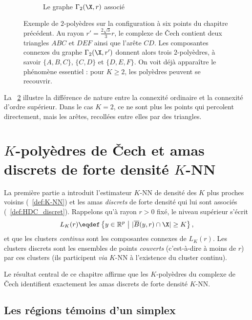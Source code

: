 \begin{figure}[!ht]
\begin{subfigure}[b]{0.48\textwidth}
        \caption{Le graphe $\Gamma_2(\X,r)$ associé}
        \label{fig:chap2_gamma2_exemple}
    \end{subfigure}
    \caption{Exemple de $2$-polyèdres sur la configuration à six points du chapitre précédent. Au rayon $r'=\frac{2\sqrt 3}{3}r$, le complexe de \v Cech contient deux triangles $ABC$ et $DEF$ ainsi que l'arête $CD$. Les composantes connexes du graphe $\Gamma_2(\X,r')$ donnent alors trois $2$-polyèdres, à savoir $\{A,B,C\}$, $\{C,D\}$ et $\{D,E,F\}$. On voit déjà apparaître le phénomène essentiel : pour $K\ge 2$, les polyèdres peuvent se recouvrir.}
    \label{fig:chap2_exemple_kpolyedres}
\end{figure}

La \Fig~\ref{fig:chap2_exemple_kpolyedres} illustre la différence de nature entre la connexité ordinaire et la connexité d'ordre supérieur. Dans le cas $K=2$, ce ne sont plus les points qui percolent directement, mais les arêtes, recollées entre elles par des triangles.

\section{$K$-polyèdres de \v Cech et amas discrets de forte densité $K$-NN}

La première partie a introduit l'estimateur $K$-NN de densité des $K$ plus proches voisins (\Def~\ref{def:K-NN}) et les amas \emph{discrets} de forte densité qui lui sont associés (\Def~\ref{def:HDC_discret}). Rappelons qu'à rayon $r>0$ fixé, le niveau supérieur s'écrit
\[
    L_K(r) \eqdef \left\{ y\in\mathbb R^p \ \middle|\ |\overline B(y,r)\cap \X|\ge K \right\},
\]
et que les clusters \emph{continus} sont les composantes connexes de $L_K(r)$. Les clusters discrets sont les ensembles de points \emph{couverts} (c'est-à-dire à moins de $r$) par ces clusters (ils participent \emph{via} $K$-NN à l'existence du cluster continu).

Le résultat central de ce chapitre affirme que les $K$-polyèdres du complexe de \v Cech identifient exactement les amas discrets de forte densité $K$-NN.

\subsection{Les régions témoins d'un simplex}

